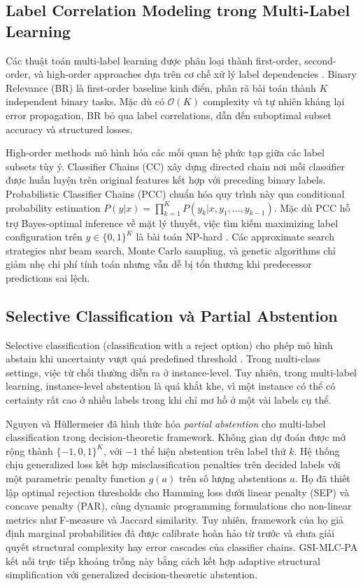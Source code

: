 \documentclass[conference]{IEEEtran}
\begin{document}
\subsection{Label Correlation Modeling trong Multi-Label Learning}
Các thuật toán multi-label learning được phân loại thành first-order, second-order, và high-order approaches dựa trên cơ chế xử lý label dependencies \cite{zhang2018binary}. Binary Relevance (BR) là first-order baseline kinh điển, phân rã bài toán thành $K$ independent binary tasks. Mặc dù có $\mathcal{O}(K)$ complexity và tự nhiên kháng lại error propagation, BR bỏ qua label correlations, dẫn đến suboptimal subset accuracy và structured losses.

High-order methods mô hình hóa các mối quan hệ phức tạp giữa các label subsets tùy ý. Classifier Chains (CC) \cite{read2011classifier} xây dựng directed chain nơi mỗi classifier được huấn luyện trên original features kết hợp với preceding binary labels. Probabilistic Classifier Chains (PCC) \cite{cheng2010bayes} chuẩn hóa quy trình này qua conditional probability estimation $P(y|x) = \prod_{k=1}^K P(y_k|x, y_1, \dots, y_{k-1})$. Mặc dù PCC hỗ trợ Bayes-optimal inference về mặt lý thuyết, việc tìm kiếm maximizing label configuration trên $y \in \{0,1\}^K$ là bài toán NP-hard \cite{dembczynski2012consistent}. Các approximate search strategies như beam search, Monte Carlo sampling, và genetic algorithms \cite{read2012monte} chỉ giảm nhẹ chi phí tính toán nhưng vẫn dễ bị tổn thương khi predecessor predictions sai lệch.

\subsection{Selective Classification và Partial Abstention}
Selective classification (classification with a reject option) cho phép mô hình abstain khi uncertainty vượt quá predefined threshold \cite{geifman2017selective}. Trong multi-class settings, việc từ chối thường diễn ra ở instance-level. Tuy nhiên, trong multi-label learning, instance-level abstention là quá khắt khe, vì một instance có thể có certainty rất cao ở nhiều labels trong khi chỉ mơ hồ ở một vài labels cụ thể.

Nguyen và H\"ullermeier \cite{nguyen2021multilabel} đã hình thức hóa \textit{partial abstention} cho multi-label classification trong decision-theoretic framework. Không gian dự đoán được mở rộng thành $\{-1, 0, 1\}^K$, với $-1$ thể hiện abstention trên label thứ $k$. Hệ thống chịu generalized loss kết hợp misclassification penalties trên decided labels với một parametric penalty function $g(a)$ trên số lượng abstentions $a$. Họ đã thiết lập optimal rejection thresholds cho Hamming loss dưới linear penalty (SEP) và concave penalty (PAR), cùng dynamic programming formulations cho non-linear metrics như F-measure và Jaccard similarity. Tuy nhiên, framework của họ giả định marginal probabilities đã được calibrate hoàn hảo từ trước và chưa giải quyết structural complexity hay error cascades của classifier chains. GSI-MLC-PA kết nối trực tiếp khoảng trống này bằng cách kết hợp adaptive structural simplification với generalized decision-theoretic abstention.
\end{document}
